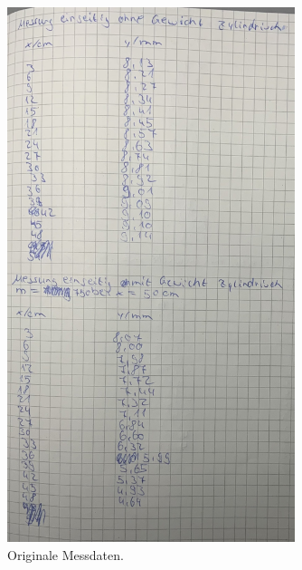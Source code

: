 \begin{figure}
    \centering
    \includegraphics[width=0.75\textwidth]{Dateien/Bild4.jpeg}
    \caption{Originale Messdaten.}
    \label{fig:daten4}
\end{figure}